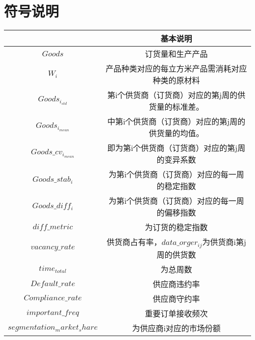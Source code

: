\documentclass[UTF8]{ctexart}
\begin{document}
\section{符号说明}
\begin{table}[!htbp]
	\begin{center}
		\begin{tabular}{c|c}
			\toprule[2pt]
			\rowcolor[gray]{0.8}

			\multicolumn{1}{m{8em}}{\centering 符号} & \multicolumn{1}{m{30em}}{\centering 基本说明}          \\


			\midrule[1.3pt]
			$Goods$                                  & 订货量和生产产品                                       \\
			$W_i$                                    & 产品种类对应的每立方米产品需消耗对应种类的原材料       \\
			$Goods_{i_{std}}$                        & 第i个供货商（订货商）对应的第j周的供货量的标准差。     \\
			$Goods_{i_{mean}}$                       & 中第i个供货商（订货商）对应的第j周的供货量的均值。     \\
			$Goods\_{cv}_{i_{mean}}$                 & 即为第i个供货商（订货商）对应的第j周的变异系数         \\
			$Goods\_stab_{i}$                        & 为第i个供货商（订货商）对应的每一周的稳定指数          \\
			$Goods\_diff_{i}$                        & 为第i个供货商（订货商）对应的每一周的偏移指数          \\
			$diff\_metric$                           & 为订货的稳定指数                                       \\
			$vacancy\_rate$                          & 供货商占有率，$data\_orger_{ij}$为供货商i第j周的供货数 \\
			$time_{total}$                           & 为总周数                                               \\
			$Default\_rate$                          & 供应商违约率                                           \\
			$Compliance\_{rate}$                     & 供应商守约率                                           \\
			$important\_freq$                        & 重要订单接收频次                                       \\

			$segmentation_market_share$              & 为供应商i对应的市场份额                                \\

			\bottomrule[2pt]
		\end{tabular}
	\end{center}
\end{table}
\end{document}
